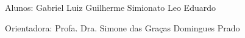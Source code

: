 \begin{folhaderosto}
	\begin{center}		
		
		\vspace*{\fill}\vspace*{\fill}
		\begin{center}
			\ABNTEXchapterfont\bfseries\Large\imprimirtitulo
		\end{center}
		\vspace*{\fill}
		
		\hspace{.45\textwidth}
		\begin{minipage}{.5\textwidth}
			\SingleSpacing
			\imprimirpreambulo
		\end{minipage}%
		
		\vspace*{1cm}
		\begin{flushright}
			\noindent Alunos:  Gabriel Luiz
			\linebreak
			\noindent Guilherme Simionato
			\linebreak
			\noindent Leo Eduardo
		\end{flushright}
		\vspace*{1cm}
		\begin{flushright}
			\noindent Orientadora: Profa. Dra. Simone das Graças Domingues Prado
		\end{flushright}
		\vspace*{1cm}
				
				
		{\large\imprimirlocal}
		\par
		{\large\imprimirdata}
		\vspace*{1cm}
		
	\end{center}
\end{folhaderosto}